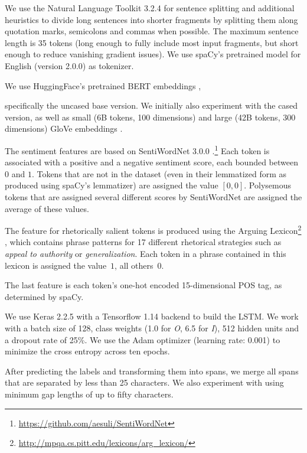 \documentclass[11pt]{article}
\begin{document}
We use the Natural Language Toolkit %
3.2.4 \cite{bird2009natural}
for sentence splitting and additional heuristics to divide long sentences into shorter fragments by splitting them along quotation marks, semicolons and commas when possible. The maximum sentence length is 35 tokens (long enough to fully include most input fragments, but short enough to reduce vanishing gradient issues).
We use spaCy's pretrained model for English (version 2.0.0) as tokenizer.

We use HuggingFace's pretrained BERT embeddings \cite{Wolf2019HuggingFacesTS},

specifically the uncased base version. 
We initially also experiment with
the cased version, as well as small (6B tokens, 100 dimensions) and large (42B tokens, 300 dimensions) GloVe embeddings \cite{pennington2014glove}.

The sentiment features are based on SentiWordNet 3.0.0 \cite{baccianella2010sentiwordnet}.\footnote{\url{https://github.com/aesuli/SentiWordNet}}
Each token is associated with a positive and a negative sentiment score, each bounded between $0$ and $1$.
Tokens that are not in the dataset (even in their lemmatized form as produced using spaCy's lemmatizer)  are assigned the value $[0, 0]$. 
Polysemous tokens that are assigned several different scores by SentiWordNet are assigned the average of these values.

The feature for rhetorically salient tokens is produced using the Arguing Lexicon\footnote{\url{http://mpqa.cs.pitt.edu/lexicons/arg_lexicon/}} \cite{somasundaran2007detecting},
which contains phrase patterns for 17 different rhetorical strategies such as \textit{appeal to authority} or \textit{generalization}.
Each token in a phrase contained in this lexicon is assigned the value~$1$, all others~$0$.

The last feature is each token's one-hot encoded 15-dimensional POS tag, as determined by spaCy.

We use Keras %
2.2.5 with a Tensorflow 1.14 backend to build the LSTM. 
We work with a batch size of 128, class weights (1.0 for \textit{O}, 6.5 for \textit{I}), 512 hidden units and a dropout rate of 25\%. 
We use the Adam optimizer (learning rate: 0.001) to minimize the cross entropy across ten epochs.

After predicting the labels and transforming them into spans, we merge all spans that are separated by less than 25 characters.
We also experiment with using minimum gap lengths of up to fifty characters.
\end{document}
